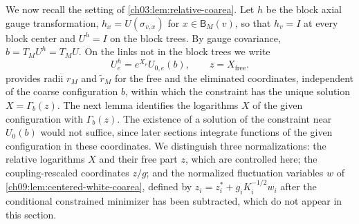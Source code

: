 We now recall the setting of \cref{ch03:lem:relative-coarea}. Let $h$ be the block axial gauge transformation, $h_x=U(\sigma_{v,x})$ for $x\in\mathsf B_M(v)$, so that $h_v=I$ at every block center and $U^h=I$ on the block trees. By gauge covariance, $b=T_MU^h=T_MU$. On the links not in the block trees we write
\[
 U^h_e=e^{X_e}U_{0,e}(b),\qquad z=X_{\mathrm{free}}.
\]
 provides radii $r_M$ and $\widetilde r_M$ for the free and the eliminated coordinates, independent of the coarse configuration $b$, within which the constraint has the unique solution $X=\Gamma_b(z)$. The next lemma identifies the logarithms $X$ of the given configuration with $\Gamma_b(z)$. The existence of a solution of the constraint near $U_0(b)$ would not suffice, since later sections integrate functions of the given configuration in these coordinates. We distinguish three normalizations: the relative logarithms $X$ and their free part $z$, which are controlled here; the coupling-rescaled coordinates $z/g$; and the normalized fluctuation variables $w$ of \cref{ch09:lem:centered-white-coarea}, defined by $z_i=z_i^*+g_iK_i^{-1/2}w_i$ after the conditional constrained minimizer has been subtracted, which do not appear in this section.

